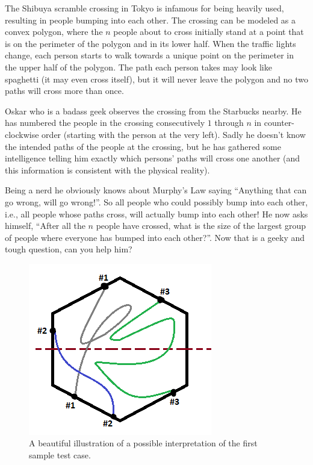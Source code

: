 

The Shibuya scramble crossing in Tokyo is infamous for being heavily used, resulting in people bumping into each other.
The crossing can be modeled as a convex polygon, where the $n$ people about to cross initially stand at a point that is on the perimeter of the polygon and in its lower half. When the traffic lights change, each person starts to walk towards a unique point on the perimeter in the upper half of the polygon. The path each person takes may look like spaghetti (it may even cross itself), but it will never leave the polygon and no two paths will cross more than once.

Oskar who is a badass geek observes the crossing from the Starbucks nearby. He has numbered the people in the crossing consecutively $1$ through $n$ in counter-clockwise order (starting with the person at the very left). Sadly he doesn't know the intended paths of the people at the crossing, but he has gathered some intelligence telling him exactly which persons' paths will cross one another (and this information is consistent with the physical reality).

Being a nerd he obviously knows about Murphy's Law saying ``Anything that can go wrong, will go
wrong!''. So all people who could possibly bump into each other, i.e., all people whose paths cross, will actually bump into each other! He now asks
himself, ``After all the $n$ people have crossed, what is the size of the largest group of people
where everyone has bumped into each other?''. Now that is a geeky and tough question, can you help
him?

\begin{figure}[h]
  \centering
  \includegraphics{shibuya_sample01_1index.png}
  \caption{A beautiful illustration of a possible interpretation of the first sample test case.}
\end{figure}

